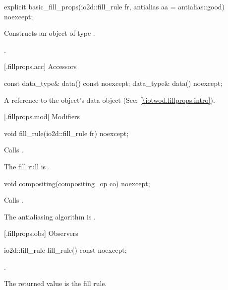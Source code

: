 %
\begin{itemdecl}
explicit basic_fill_props(io2d::fill_rule fr, antialias aa = antialias::good) 
  noexcept;
\end{itemdecl}
\begin{itemdescr}
\pnum
\effects
Constructs an object of type .

\pnum
\postconditions
{}.
\end{itemdescr}

 [\iotwod.fillprops.acc] {Accessors}

%
\begin{itemdecl}
const data_type& data() const noexcept;
data_type& data() noexcept;
\end{itemdecl}
\begin{itemdescr}
\pnum
\returns A reference to the  object's data object (See: \ref{\iotwod.fillprops.intro}).
\end{itemdescr}

 [\iotwod.fillprops.mod] {Modifiers}

%
\begin{itemdecl}
void fill_rule(io2d::fill_rule fr) noexcept;
\end{itemdecl}
\begin{itemdescr}
\pnum
\effects
Calls .

\remarks
The fill rull is .
\end{itemdescr}

%
\begin{itemdecl}
void compositing(compositing_op co) noexcept;
\end{itemdecl}
\begin{itemdescr}
\pnum
\effects
Calls .

\remarks
The antialiasing algorithm is .
\end{itemdescr}

 [\iotwod.fillprops.obs] {Observers}

%
\begin{itemdecl}
io2d::fill_rule fill_rule() const noexcept;
\end{itemdecl}
\begin{itemdescr}
\pnum
\returns
{}.

\pnum
\remarks
The returned value is the fill rule.
\end{itemdescr}

